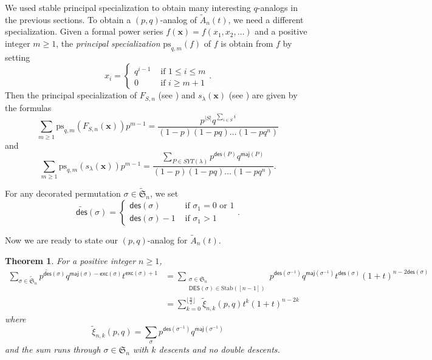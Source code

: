 \documentclass[reqno]{amsart}
\newcommand{\DES}{{\mathsf{DES}}}
\newcommand{\des}{{\mathsf{des}}}
\newcommand{\exc}{{\mathsf{exc}}}
\newcommand{\maj}{{\mathsf{maj}}}
\newcommand{\psm}{{\mathrm{ps}_{q,m}}}
\newcommand{\Stab}{{\mathrm{Stab}}}
\renewcommand{\S}{{\mathfrak{S}}}
\newcommand{\x}{{\mathbf{x}}}
\newtheorem{thm}{Theorem}[section]
\theoremstyle{definition}
\theoremstyle{remark}
\begin{document}
We used stable principal specialization to obtain many interesting $q$-analogs in the previous sections. To obtain a $(p,q)$-analog of $\widetilde{A}_n(t)$, we need a different specialization. Given a formal power series $f(\x)=f(x_1,x_2,\ldots)$ and a positive integer $m\ge 1$, the \emph{principal specialization} $\psm(f)$ of $f$ is obtain from $f$ by setting 
\[
    x_i=\begin{cases}
        q^{i-1} & \text{ if }1\le i\le m\\
        0       & \text{ if }i\ge m+1
    \end{cases}.
\]
Then the principal specialization of $F_{S,n}$ (see \cite[Lemma 5.2]{Gessel1993cycle}) and $s_{\lambda}(\x)$ (see \cite[Proposition 7.19.12]{StanleyEC2}) are given by the formulas
\begin{equation} \label{eq:psmF}
    \sum_{m\ge 1}\psm(F_{S,n}(\x))p^{m-1}=\frac{p^{|S|}q^{\sum_{i\in S}i}}{(1-p)(1-pq)\ldots(1-pq^n)}
\end{equation}
and
\begin{equation} \label{eq:psmSchur}
    \sum_{m\ge 1}\psm(s_{\lambda}(\x))p^{m-1}=\frac{\sum_{P\in SYT(\lambda)}p^{\des(P)}q^{\maj(P)}}{(1-p)(1-pq)\ldots(1-pq^n)}.
\end{equation}

For any decorated permutation $\sigma\in\widetilde{\S}_n$, we set 
\[
    \widetilde{\des}(\sigma)=\begin{cases}
        \des(\sigma) & \text{ if }\sigma_1=0 \text{ or }1\\
        \des(\sigma)-1 & \text{ if }\sigma_1>1
    \end{cases}.
\]





Now we are ready to state our $(p,q)$-analog for $\widetilde{A}_n(t)$.

\begin{thm} \label{thm:pqAnalog}
For a positive integer $n\ge 1$,
\begin{align*}
    \sum_{\sigma\in\widetilde{\S}_n}p^{\widetilde{\des}(\sigma)}q^{\maj(\sigma)-\exc(\sigma)}t^{\exc(\sigma)+1}
    &=\sum_{\substack{\sigma\in\S_n \\ \DES(\sigma)\in\Stab([n-1])}}p^{\des(\sigma^{-1})}q^{\maj(\sigma^{-1})}t^{\des(\sigma)}(1+t)^{n-2\des(\sigma)}\\
    &=\sum_{k=0}^{\lfloor\frac{n}{2}\rfloor}\widetilde{\xi}_{n,k}(p,q) t^k(1+t)^{n-2k}
\end{align*}
where 
\[
    \widetilde{\xi}_{n,k}(p,q)=\sum_{\sigma}p^{\des(\sigma^{-1})}q^{\maj(\sigma^{-1})}
\]
and the sum runs through $\sigma\in\S_n$ with $k$ descents and no double descents.
\end{thm}
\end{document}
